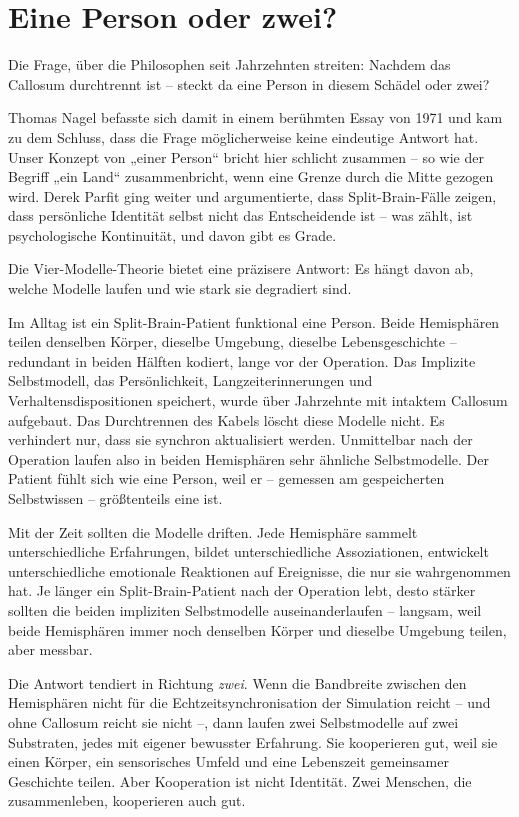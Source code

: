 \documentclass[11pt, twoside, openright]{book}
\begin{document}
\section*{Eine Person oder zwei?}

Die Frage, über die Philosophen seit Jahrzehnten streiten: Nachdem das Callosum durchtrennt ist -- steckt da eine Person in diesem Schädel oder zwei?

Thomas Nagel befasste sich damit in einem berühmten Essay von 1971 und kam zu dem Schluss, dass die Frage möglicherweise keine eindeutige Antwort hat. Unser Konzept von „einer Person“ bricht hier schlicht zusammen -- so wie der Begriff „ein Land“ zusammenbricht, wenn eine Grenze durch die Mitte gezogen wird. Derek Parfit ging weiter und argumentierte, dass Split-Brain-Fälle zeigen, dass persönliche Identität selbst nicht das Entscheidende ist -- was zählt, ist psychologische Kontinuität, und davon gibt es Grade.

Die Vier-Modelle-Theorie bietet eine präzisere Antwort: Es hängt davon ab, welche Modelle laufen und wie stark sie degradiert sind.

Im Alltag ist ein Split-Brain-Patient funktional eine Person. Beide Hemisphären teilen denselben Körper, dieselbe Umgebung, dieselbe Lebensgeschichte -- redundant in beiden Hälften kodiert, lange vor der Operation. Das Implizite Selbstmodell, das Persönlichkeit, Langzeiterinnerungen und Verhaltensdispositionen speichert, wurde über Jahrzehnte mit intaktem Callosum aufgebaut. Das Durchtrennen des Kabels löscht diese Modelle nicht. Es verhindert nur, dass sie synchron aktualisiert werden. Unmittelbar nach der Operation laufen also in beiden Hemisphären sehr ähnliche Selbstmodelle. Der Patient fühlt sich wie eine Person, weil er -- gemessen am gespeicherten Selbstwissen -- größtenteils eine ist.

Mit der Zeit sollten die Modelle driften. Jede Hemisphäre sammelt unterschiedliche Erfahrungen, bildet unterschiedliche Assoziationen, entwickelt unterschiedliche emotionale Reaktionen auf Ereignisse, die nur sie wahrgenommen hat. Je länger ein Split-Brain-Patient nach der Operation lebt, desto stärker sollten die beiden impliziten Selbstmodelle auseinanderlaufen -- langsam, weil beide Hemisphären immer noch denselben Körper und dieselbe Umgebung teilen, aber messbar.

Die Antwort tendiert in Richtung \textit{zwei}. Wenn die Bandbreite zwischen den Hemisphären nicht für die Echtzeitsynchronisation der Simulation reicht -- und ohne Callosum reicht sie nicht --, dann laufen zwei Selbstmodelle auf zwei Substraten, jedes mit eigener bewusster Erfahrung. Sie kooperieren gut, weil sie einen Körper, ein sensorisches Umfeld und eine Lebenszeit gemeinsamer Geschichte teilen. Aber Kooperation ist nicht Identität. Zwei Menschen, die zusammenleben, kooperieren auch gut.
\end{document}

